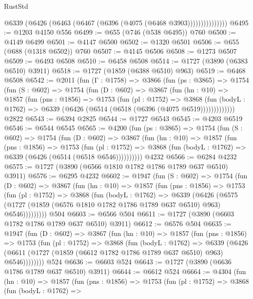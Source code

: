 \begin{lexlean}{RustStd}
\begin{coremodule}
                    @6339 (@6426 (@6463 (@6467 (@6396 (@4075 (@6468 @3903)))))))))))))))
@6495 := @1203 @4150 @556
@6499 := @655 (@746 (@538 @6495)) @760
@6500 := @4149 @6499
@6501 := @4147 @6500
@6502 := @1320 @6501
@6506 := @655 (@688 (@1318 @6502)) @760
@6507 := @4145 @6506
@6508 := @1273 @6507
@6509 := @6493 @6508
@6510 := @6458 @6508
@6514 := @1727 (@3890 (@6383 @6510) @3911)
@6518 := @1727 (@1859 (@6388 @6510) @963)
@6519 := @6468 @6508
@6542 := @2011
    (fun (Γ : @1758) =>
    @3866
      (fun (ps : @3865) =>
      @1754
        (fun (S : @602) =>
        @1754
          (fun (D : @602) =>
          @3867
            (fun (hn : @10) =>
            @1857
              (fun (pns : @1856) =>
              @1753
                (fun (pl : @1752) =>
                @3868
                  (fun (bodyL : @1762) =>
                  @6339 (@6426 (@6514 (@6518 (@6396 (@4075 @6519)))))))))))))
    @2822
@6543 := @6394 @2825
@6544 := @1727 @6543
@6545 := @4203 @6519
@6546 := @6544 @6545
@6565 := @4200
    (fun (ps : @3865) =>
    @1754
      (fun (S : @602) =>
      @1754
        (fun (D : @602) =>
        @3867
          (fun (hn : @10) =>
          @1857
            (fun (pns : @1856) =>
            @1753
              (fun (pl : @1752) =>
              @3868 (fun (bodyL : @1762) => @6339 (@6426 (@6514 (@6518 @6546))))))))))
    @4232
@6566 := @6284 @4232
@6575 := @1727 (@3890 (@6566 @1810 @1782 @1786 @1789 @637 @6510) @3911)
@6576 := @6295 @4232
@6602 := @1947
    (fun (S : @602) =>
    @1754
      (fun (D : @602) =>
      @3867
        (fun (hn : @10) =>
        @1857
          (fun (pns : @1856) =>
          @1753
            (fun (pl : @1752) =>
            @3868
              (fun (bodyL : @1762) =>
              @6339
                (@6426
                  (@6575
                    (@1727 (@1859 (@6576 @1810 @1782 @1786 @1789 @637 @6510) @963) @6546)))))))))
    @504
@6603 := @6566 @504
@6611 := @1727 (@3890 (@6603 @1782 @1786 @1789 @637 @6510) @3911)
@6612 := @6576 @504
@6635 := @1947
    (fun (D : @602) =>
    @3867
      (fun (hn : @10) =>
      @1857
        (fun (pns : @1856) =>
        @1753
          (fun (pl : @1752) =>
          @3868
            (fun (bodyL : @1762) =>
            @6339
              (@6426 (@6611 (@1727 (@1859 (@6612 @1782 @1786 @1789 @637 @6510) @963) @6546))))))))
    @524
@6636 := @6603 @524
@6643 := @1727 (@3890 (@6636 @1786 @1789 @637 @6510) @3911)
@6644 := @6612 @524
@6664 := @4304
    (fun (hn : @10) =>
    @1857
      (fun (pns : @1856) =>
      @1753
        (fun (pl : @1752) =>
        @3868
          (fun (bodyL : @1762) =>

\end{coremodule}
\end{lexlean}
